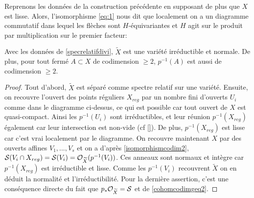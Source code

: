 \begin{rem}\label{lisseGoodQuotient}
Reprenons les données de la construction précédente en supposant de plus que $X$ est lisse. Alors, l'isomorphisme \ref{eq:1} nous dit que localement on a un diagramme commutatif dans lequel les flèches sont $H$-équivariantes et $H$ agit sur le produit par multiplication sur le premier facteur:
\begin{center}
\end{center}
\end{rem}


\begin{prop}\label{preimagecodim2}
Avec les données de \ref{specrelatifdivi}, $\widetilde{X}$ est une variété irréductible et normale. De plus, pour tout fermé $A\subset X$ de codimension $\geq 2$, $p^{-1}(A)$ est aussi de codimension $\geq 2$.
\end{prop}
\begin{proof}
Tout d'abord, $\widetilde{X}$ est séparé comme spectre relatif sur une variété. Ensuite, on recouvre l'ouvert des points réguliers $X_{reg}$ par un nombre fini d'ouverts $U_i$ comme dans le diagramme ci-dessus, ce qui est possible car tout ouvert de $X$ est quasi-compact. Ainsi les $p^{-1}(U_i)$ sont irréductibles, et leur réunion $p^{-1}(X_{reg})$ également car leur intersection est non-vide (cf \ref{}). De plus, $p^{-1}(X_{reg})$ est lisse car c'est vrai localement par le diagramme. On recouvre maintenant $X$ par des ouverts affines $V_1,...,V_s$ et on a d'après \ref{isomorphismcodim2}, $\mathcal{S}(V_i\cap X_{reg})=\mathcal{S}(V_i)=\mathcal{O}_{\widetilde{X}}(p^{-1}(V_i))$. Ces anneaux sont normaux et intègre car $p^{-1}(X_{reg})$ est irréductible et lisse. Comme les $p^{-1}(V_i)$ recouvrent $\widetilde{X}$ on en déduit la normalité et l'irréductibilité.
Pour la dernière assertion, c'est une conséquence directe du fait que $p_*\mathcal{O}_{\widetilde{X}}=\mathcal{S}$ et de \ref{cohomcodimgeq2}.
\end{proof}

